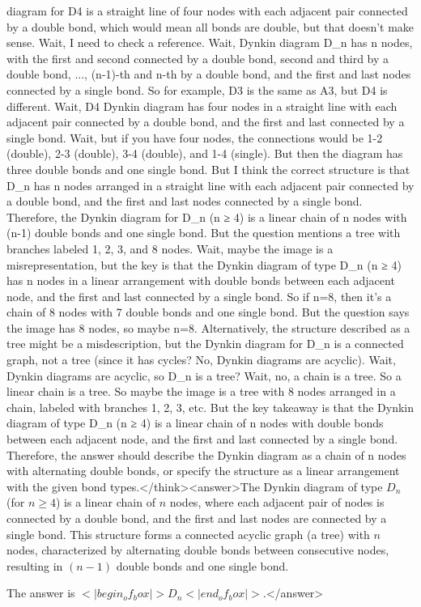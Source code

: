 diagram for D4 is a straight line of four nodes with each adjacent pair connected by a double bond, which would mean all bonds are double, but that doesn't make sense. Wait, I need to check a reference. Wait, Dynkin diagram D_n has n nodes, with the first and second connected by a double bond, second and third by a double bond, ..., (n-1)-th and n-th by a double bond, and the first and last nodes connected by a single bond. So for example, D3 is the same as A3, but D4 is different. Wait, D4 Dynkin diagram has four nodes in a straight line with each adjacent pair connected by a double bond, and the first and last connected by a single bond. Wait, but if you have four nodes, the connections would be 1-2 (double), 2-3 (double), 3-4 (double), and 1-4 (single). But then the diagram has three double bonds and one single bond. But I think the correct structure is that D_n has n nodes arranged in a straight line with each adjacent pair connected by a double bond, and the first and last nodes connected by a single bond. Therefore, the Dynkin diagram for D_n (n ≥ 4) is a linear chain of n nodes with (n-1) double bonds and one single bond. But the question mentions a tree with branches labeled 1, 2, 3, and 8 nodes. Wait, maybe the image is a misrepresentation, but the key is that the Dynkin diagram of type D_n (n ≥ 4) has n nodes in a linear arrangement with double bonds between each adjacent node, and the first and last connected by a single bond. So if n=8, then it's a chain of 8 nodes with 7 double bonds and one single bond. But the question says the image has 8 nodes, so maybe n=8. Alternatively, the structure described as a tree might be a misdescription, but the Dynkin diagram for D_n is a connected graph, not a tree (since it has cycles? No, Dynkin diagrams are acyclic). Wait, Dynkin diagrams are acyclic, so D_n is a tree? Wait, no, a chain is a tree. So a linear chain is a tree. So maybe the image is a tree with 8 nodes arranged in a chain, labeled with branches 1, 2, 3, etc. But the key takeaway is that the Dynkin diagram of type D_n (n ≥ 4) is a linear chain of n nodes with double bonds between each adjacent node, and the first and last connected by a single bond. Therefore, the answer should describe the Dynkin diagram as a chain of n nodes with alternating double bonds, or specify the structure as a linear arrangement with the given bond types.</think><answer>The Dynkin diagram of type \( D_n \) (for \( n \geq 4 \)) is a linear chain of \( n \) nodes, where each adjacent pair of nodes is connected by a double bond, and the first and last nodes are connected by a single bond. This structure forms a connected acyclic graph (a tree) with \( n \) nodes, characterized by alternating double bonds between consecutive nodes, resulting in \( (n-1) \) double bonds and one single bond.  

The answer is \(<|begin_of_box|>D_n<|end_of_box|>\).</answer>